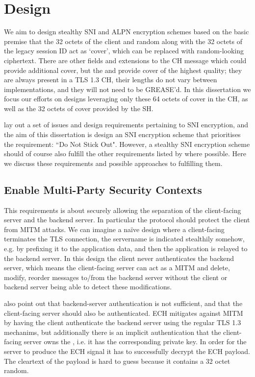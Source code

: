 \chapter{Design}
\label{chap:Design}

We aim to design stealthy \ac{SNI} and \ac{ALPN} encryption schemes based
on the basic premise that the 32 octets of the client and random
along with the 32 octets of the legacy session ID act as `cover',
which can be replaced with random-looking ciphertext.
There are other fields and extensions to the \ac{CH} message
which could provide additional cover,
but the  and 
provide cover of the highest quality; they are always present in a \ac{TLS} 1.3 \ac{CH},
their lengths do not vary between implementations, and they will not
need to be \ac{GREASE}'d.
In this dissertation
we focus our efforts on designs leveraging only these 64 octets of cover in the \ac{CH},
as well as the 32 octets of cover provided by the \ac{SH}.

\cite{rfc8744-issues} lay out a set of issues and design requirements pertaining to \ac{SNI} encryption, and the aim of this dissertation is design an \ac{SNI} encryption scheme that prioritises the requirement: ``Do Not Stick Out". However, a stealthy \ac{SNI} encryption scheme should of course also fulfill the other requirements listed by \cite{rfc8744-issues} where possible. Here we discuss these requirements and possible approaches to fulfilling them.

\section{Enable Multi-Party Security Contexts}
This requirements is about securely allowing the separation of the client-facing server and the backend server. In particular the protocol should protect the client from \ac{MITM} attacks. We can imagine a naïve design where a client-facing terminates the \ac{TLS} connection, the servername is indicated stealthily somehow, e.g. by prefixing it to the application data, and then the application is relayed to the backend server. In this design the client never authenticates the backend server, which means the client-facing server can act as a \ac{MITM} and delete, modify, reorder messages to/from the backend server without the client or backend server being able to detect these modifications.

\cite{rfc8744-issues} also point out that backend-server authentication is not sufficient,
and that the client-facing server should also be authenticated.
\ac{ECH} mitigates against \ac{MITM}
by having the client authenticate
the backend server using the regular
\ac{TLS} 1.3 mechanims,
but additionally there is an implicit authentication that the client-facing server owns the ,
i.e. it has the corresponding private key.
In order for the server
to produce the \ac{ECH}  signal
it has to successfully decrypt the \ac{ECH} payload.
The cleartext of the payload is hard to 
guess because it contains a 32 octet random.

